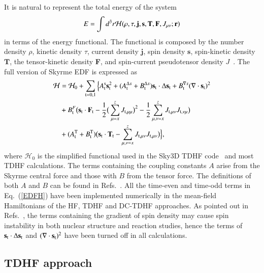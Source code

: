 It is natural to represent the total energy of the system
\begin{equation}
E=\int d^3r  {\cal H}(\rho, \tau, {\mathbf{j}}, {\textbf{s}}, {\textbf{T}}, {\textbf{F}}, J_{\mu\nu}; {\mathbf{r}})
\label{Energy}
\end{equation}
in terms of the energy functional. The functional is composed by
the number density $\rho$, kinetic density $\tau$, current density ${\mathbf{j}}$, spin density ${\mathbf{s}}$, spin-kinetic density ${\mathbf{T}}$,
the tensor-kinetic density {\textbf{F}}, and spin-current pseudotensor density $J$~\citep{Stevenson2016_PRC93-054617}. The full version of Skyrme EDF is expressed as
\begin{align}
\label{EDFH}
\begin{split}
\mathcal{H}&=\mathcal{H}_0+\sum_{\rm{t=0,1}}\Big\{A_{\rm{t}}^{\rm{s}}\mathbf{s}_{\rm{t}}^2+(A_{\rm{t}}^{\Delta{s}}+B_{\rm{t}}^{\Delta{s}})
\mathbf{s}_{\rm{t}}\cdot\Delta\mathbf{s}_{\rm{t}}+B_{\rm{t}}^{\nabla s}(\nabla\cdot \mathbf{s}_{\rm{t}})^2 \\
&+B_{\rm{t}}^{F}\big(\mathbf{s}_{\rm{t}}\cdot
\mathbf {F}_{\rm{t}}-\frac{1}{2}\big(\sum_{\mu=x}^{z}J_{\rm{t}, \mu\mu}\big)^2-\frac{1}{2}\sum_{\mu, \nu=x}^{z}J_{\rm{t}, \mu\nu}J_{\rm{t}, \nu \mu}\big)\\
&+(A_{\rm{t}}^{\rm{T}}+B_{\rm{t}}^{\rm{T}})\big(\mathbf{s}_{\rm{t}}\cdot\mathbf{T}_{\rm{t}}-
\sum_{\mu,\nu=x}^{z}J_{\rm{t},\mu\nu}J_{\rm{t},\mu\nu}\big)\Big\},
\end{split}
\end{align}
where $\mathcal{H}_0$ is the simplified functional used in the Sky3D TDHF code~\citep{Maruhn2014_CPC185-2195} and most TDHF calculations.
The terms containing the coupling constants $A$ arise from the Skyrme central force and those with $B$ from the tensor force. The definitions of both $A$ and $B$
can be found in Refs.~\citep{Lesinski2007_PRC76-014312,Davesne2009_PRC80-024314}. All the time-even and time-odd terms in Eq.~(\ref{EDFH}) have been implemented numerically in the mean-field Hamiltonians of the HF, TDHF and
DC-TDHF approaches.
As pointed out in Refs.~\citep{Lesinski2007_PRC76-014312,Stevenson2016_PRC93-054617}, the terms containing the gradient of spin density may cause spin instability in both nuclear structure and reaction studies, hence the terms of $\mathbf{s}_{\rm{t}}\cdot\Delta\mathbf{s}_{\rm{t}}$ and $(\nabla\cdot \mathbf{s}_{\rm{t}})^2$ have been turned off in all calculations.

\subsection{TDHF approach}

